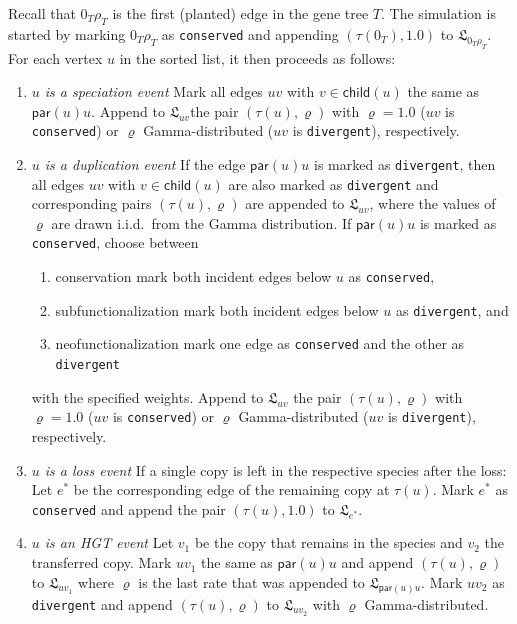 \documentclass[hidelinks,11pt]{scrreprt}
\newcommand{\child}{\mathsf{child}}
\newcommand{\parent}{\mathsf{par}}
\begin{document}
Recall that $0_T\rho_T$ is the first (planted) edge in the gene tree $T$. The simulation is started by marking $0_T\rho_T$ as \texttt{conserved} and appending $(\tau(0_T), 1.0)$ to $\mathfrak{L}_{0_T\rho_T}$.
For each vertex $u$ in the sorted list, it then proceeds as follows:
\renewcommand{\labelenumi}{\alph{enumi})}
\renewcommand{\labelenumii}{\roman{enumii})}
\begin{enumerate}
	\item \textit{$u$ is a speciation event}\newline
	Mark all edges $uv$ with $v \in \child(u)$ the same as $\parent(u)u$. Append to $\mathfrak{L}_{uv}$the pair $(\tau(u), \varrho)$ with $\varrho=1.0$ ($uv$ is \texttt{conserved}) or $\varrho$ Gamma-distributed ($uv$ is \texttt{divergent}), respectively.
	\item \textit{$u$ is a duplication event}\newline
	If the edge $\parent(u)u$ is marked as \texttt{divergent}, then all edges $uv$ with $v \in \child(u)$ are also marked as \texttt{divergent} and corresponding pairs $(\tau(u),\varrho)$ are appended to
	$\mathfrak{L}_{uv}$, where the values of $\varrho$ are drawn i.i.d.\ from the Gamma distribution.
	If $\parent(u)u$ is marked as \texttt{conserved}, choose between 
	\begin{enumerate}
		\item conservation\newline
		mark both incident edges below $u$ as \texttt{conserved},
		\item subfunctionalization\newline
		mark both incident edges below $u$ as \texttt{divergent}, and
		\item neofunctionalization\newline
		mark one edge as \texttt{conserved} and the other as \texttt{divergent}
	\end{enumerate}
	with the specified weights.
	Append to $\mathfrak{L}_{uv}$ the pair $(\tau(u), \varrho)$ with $\varrho=1.0$ ($uv$ is \texttt{conserved}) or $\varrho$ Gamma-distributed ($uv$ is \texttt{divergent}), respectively.
	\item \textit{$u$ is a loss event}\newline
	If a single copy is left in the respective species after the loss: Let $e^*$ be the corresponding edge of the remaining copy at $\tau(u)$. Mark $e^*$ as \texttt{conserved} and append the pair $(\tau(u),1.0)$ to $\mathfrak{L}_{e^*}$.
	\item \textit{$u$ is an HGT event}\newline
	Let $v_1$ be the copy that remains in the species and $v_2$ the transferred copy. Mark $uv_1$ the same as $\parent(u)u$ and append $(\tau(u),\varrho)$ to $\mathfrak{L}_{uv_1}$ where $\varrho$ is the last rate that was appended to $\mathfrak{L}_{\parent(u)u}$. Mark $uv_2$ as \texttt{divergent} and append $(\tau(u),\varrho)$ to $\mathfrak{L}_{uv_2}$ with $\varrho$ Gamma-distributed.
\end{enumerate}
\end{document}
